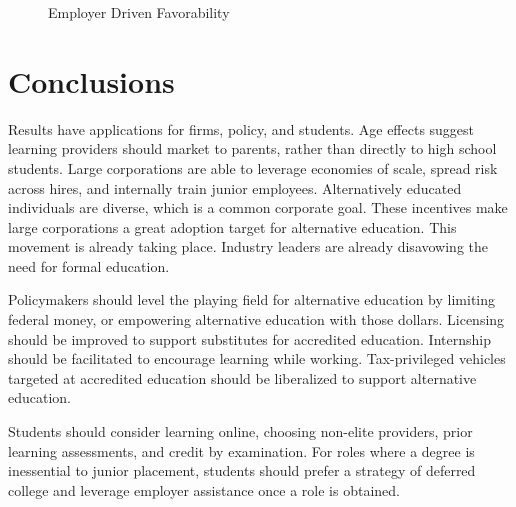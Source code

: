 \documentclass[review]{elsarticle}
\begin{document}
        \begin{figure}[h!]
            \centering
            \caption{Employer Driven Favorability}
        

            \label{fig:employer_driven_favorability}
            \end{figure}

        \section{Conclusions}
        
        Results have applications for firms, policy, and students.
        Age effects suggest learning providers should market to parents,
        rather than directly to high school students.
        Large corporations are able to leverage economies of scale, spread risk across hires,
        and internally train junior employees.
        Alternatively educated individuals are diverse\cite{florentine_2018}, which is a common corporate goal.
        These incentives make large corporations a great adoption target for alternative education.
        This movement is already taking place. Industry leaders are already disavowing the need for formal education\cite{glassdoor_2018}.

        Policymakers should level the playing field for alternative education by limiting federal money,
        or empowering alternative education with those dollars.
        Licensing should be improved to support substitutes for accredited education.
        Internship should be facilitated to encourage learning while working.
        Tax-privileged vehicles targeted at accredited education should be liberalized
        to support alternative education.

        Students should consider learning online, choosing non-elite providers,
        prior learning assessments, and credit by examination.
        For roles where a degree is inessential to junior placement, students should prefer a strategy of
        deferred college and leverage employer assistance once a role is obtained.
        
        
        
        
\end{document}
